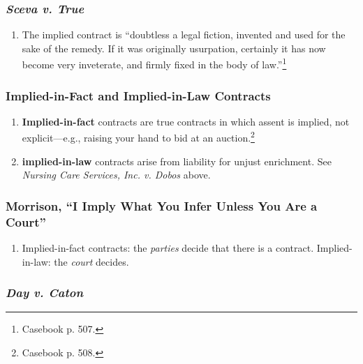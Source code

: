 \subsubsection{\emph{Sceva v. True}}

\begin{enumerate}
    \item The implied contract is ``doubtless a legal fiction, invented and 
    used for the sake of the remedy. If it was originally usurpation, 
    certainly it has now become very inveterate, and firmly fixed in the body 
    of law.''\footnote{Casebook p. 507.}
\end{enumerate}

\subsubsection{Implied-in-Fact and Implied-in-Law Contracts}

\begin{enumerate}
    \item \textbf{Implied-in-fact} contracts are true contracts in which 
    assent is implied, not explicit---e.g., raising your hand to bid at an 
    auction.\footnote{Casebook p. 508.}
    \item \textbf{implied-in-law} contracts arise from liability for unjust 
    enrichment. See \emph{Nursing Care Services, Inc. v. Dobos} above.
\end{enumerate}

\subsubsection{Morrison, ``I Imply What You Infer Unless You Are a Court''}

\begin{enumerate}
    \item Implied-in-fact contracts: the \emph{parties} decide that there is 
    a contract. Implied-in-law: the \emph{court} decides.
\end{enumerate}

\subsubsection{\emph{Day v. Caton}}

